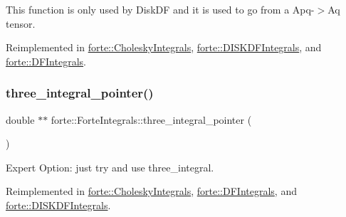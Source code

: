 This function is only used by Disk\+DF and it is used to go from a Apq-\/$>$Aq tensor. 



Reimplemented in \mbox{\hyperlink{classforte_1_1_cholesky_integrals_a4f07e4c8e13a3424ec6b3d3a4d59a258}{forte\+::\+Cholesky\+Integrals}}, \mbox{\hyperlink{classforte_1_1_d_i_s_k_d_f_integrals_a754ec30830dd51627a3608dfca9f5f4d}{forte\+::\+D\+I\+S\+K\+D\+F\+Integrals}}, and \mbox{\hyperlink{classforte_1_1_d_f_integrals_a455cc314d177bbcd4c25cbca6b0f02be}{forte\+::\+D\+F\+Integrals}}.

\mbox{\label{classforte_1_1_forte_integrals_a69292bc8e42a76e344cd01c4e3dd48d5}} 
\subsubsection{\texorpdfstring{three\+\_\+integral\+\_\+pointer()}{three\_integral\_pointer()}}
{\footnotesize\ttfamily double $\ast$$\ast$ forte\+::\+Forte\+Integrals\+::three\+\_\+integral\+\_\+pointer (\begin{DoxyParamCaption}{ }\end{DoxyParamCaption})\hspace{0.3cm}{\ttfamily [virtual]}}



Expert Option\+: just try and use three\+\_\+integral. 



Reimplemented in \mbox{\hyperlink{classforte_1_1_cholesky_integrals_ac92cb7a11e5a027ba6ccd11181ddf61a}{forte\+::\+Cholesky\+Integrals}}, \mbox{\hyperlink{classforte_1_1_d_f_integrals_ad682d1f719de96683aa2bc02fc46eabe}{forte\+::\+D\+F\+Integrals}}, and \mbox{\hyperlink{classforte_1_1_d_i_s_k_d_f_integrals_a43f80b9c9e3b67223a11049c3e2f52e2}{forte\+::\+D\+I\+S\+K\+D\+F\+Integrals}}.

\mbox{\label{classforte_1_1_forte_integrals_a8c30851e608fc99e86990688dce95b85}} 
